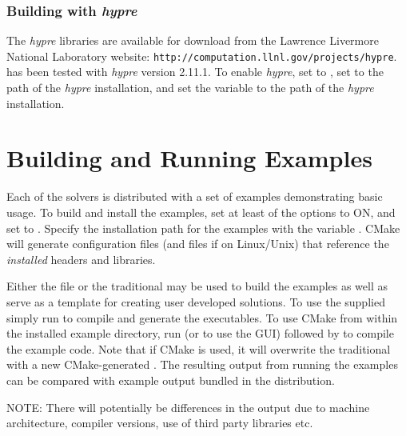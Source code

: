 \subsubsection*{Building with \textit{hypre}}
The \textit{hypre} libraries are available for download from the Lawrence Livermore
National Laboratory website: {\tt http://computation.llnl.gov/projects/hypre}.
{\sundials} has been tested with \textit{hypre} version 2.11.1. 
To enable \textit{hypre}, set   to , set 
to the  path of the \textit{hypre} installation, and set the variable
 to the  path of the \textit{hypre} installation.

\section{Building and Running Examples}
Each of the {\sundials} solvers is distributed with a set of examples
demonstrating basic usage. To build and install the examples, set at
least of the  options to ON, and
set  to .
Specify the installation path for the examples with the variable . CMake will generate
 configuration files (and  files if on Linux/Unix) that reference the
{\em installed} {\sundials} headers and libraries.

Either the  file or the traditional  may be used to build the examples
as well as serve as a template for creating user developed solutions.
To use the supplied  simply run  to compile and generate the executables.
To use CMake from within the installed example directory, run  (or  to use the GUI)
followed by  to compile the example code.
Note that if CMake is used, it will overwrite the traditional  with a new CMake-generated .
The resulting output from running the examples can be compared with example output bundled
in the {\sundials} distribution.

\noindent NOTE: There will potentially be differences in the output due to machine architecture, compiler versions,
use of third party libraries etc.{\warn} 


